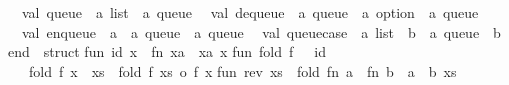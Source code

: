 \begin{isabellebody}
\begin{isamarkuptext}
\ \ val\ queue\ {}\ {}a\ list\ {}{}\ {}a\ queue\isanewline
\ \ val\ dequeue\ {}\ {}a\ queue\ {}{}\ {}a\ option\ {}\ {}a\ queue\isanewline
\ \ val\ enqueue\ {}\ {}a\ {}{}\ {}a\ queue\ {}{}\ {}a\ queue\isanewline
\ \ val\ queue{}case\ {}\ {}{}a\ list\ {}{}\ {}b{}\ {}{}\ {}a\ queue\ {}{}\ {}b\isanewline
end\ {}\ struct\isanewline
\isanewline
fun\ id\ x\ {}\ {}fn\ xa\ {}{}\ xa{}\ x{}\isanewline
\isanewline
fun\ fold\ f\ {}{}\ {}\ id\isanewline
\ \ {}\ fold\ f\ {}x\ {}{}\ xs{}\ {}\ fold\ f\ xs\ o\ f\ x{}\isanewline
\isanewline
fun\ rev\ xs\ {}\ fold\ {}fn\ a\ {}{}\ fn\ b\ {}{}\ a\ {}{}\ b{}\ xs\ {}{}{}\isanewline
\isanewline

\end{isamarkuptext}
\end{isabellebody}
